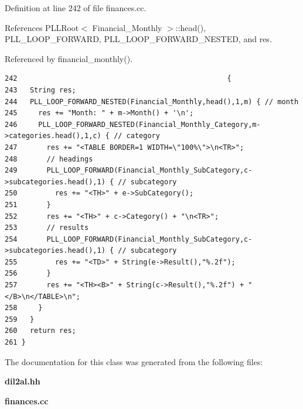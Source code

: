 Definition at line 242 of file finances.cc.

References PLLRoot$<$ Financial\_\-Monthly $>$::head(), PLL\_\-LOOP\_\-FORWARD, PLL\_\-LOOP\_\-FORWARD\_\-NESTED, and res.

Referenced by financial\_\-monthly().



\footnotesize\begin{verbatim}242                                                  {
243   String res;
244   PLL_LOOP_FORWARD_NESTED(Financial_Monthly,head(),1,m) { // month
245     res += "Month: " + m->Month() + '\n';
246     PLL_LOOP_FORWARD_NESTED(Financial_Monthly_Category,m->categories.head(),1,c) { // category
247       res += "<TABLE BORDER=1 WIDTH=\"100%\">\n<TR>";
248       // headings
249       PLL_LOOP_FORWARD(Financial_Monthly_SubCategory,c->subcategories.head(),1) { // subcategory
250         res += "<TH>" + e->SubCategory();
251       }
252       res += "<TH>" + c->Category() + "\n<TR>";
253       // results
254       PLL_LOOP_FORWARD(Financial_Monthly_SubCategory,c->subcategories.head(),1) { // subcategory
255         res += "<TD>" + String(e->Result(),"%.2f");
256       }
257       res += "<TH><B>" + String(c->Result(),"%.2f") + "</B>\n</TABLE>\n";
258     }
259   }
260   return res;
261 }
\end{verbatim}\normalsize 


The documentation for this class was generated from the following files:\begin{CompactItemize}
\item 
{\bf dil2al.hh}\item 
{\bf finances.cc}\end{CompactItemize}
